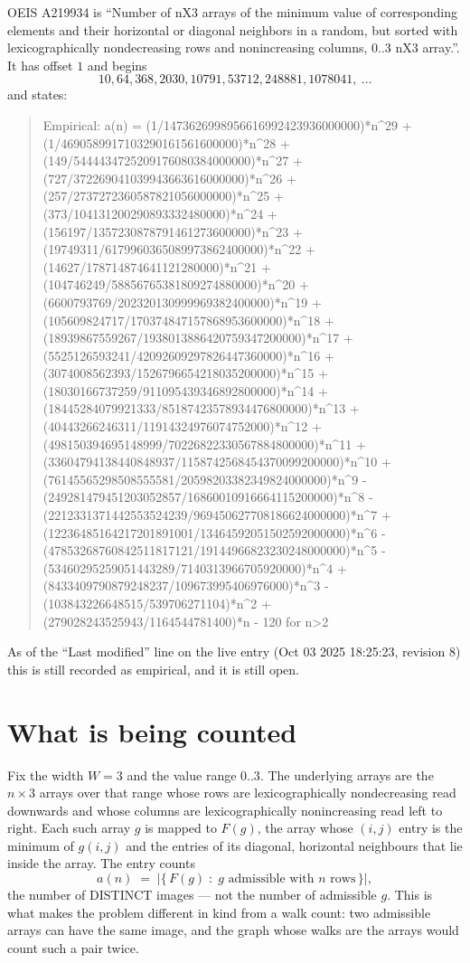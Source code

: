 \documentclass[11pt,a4paper]{article}
\theoremstyle{plain}
\theoremstyle{definition}
\begin{document}
OEIS A219934 is ``Number of nX3 arrays of the minimum value of corresponding elements and their horizontal or diagonal neighbors in a random, but sorted with lexicographically nondecreasing rows and nonincreasing columns, 0..3 nX3 array.''. It has offset $1$ and begins
\[
10, 64, 368, 2030, 10791, 53712, 248881, 1078041,\ \dots
\]
and states:
\begin{quote}
Empirical: a(n) = (1/1473626998956616992423936000000)*n\^{}29 + (1/4690589917103290161561600000)*n\^{}28 + (149/5444434725209176080384000000)*n\^{}27 + (727/372269041039943663616000000)*n\^{}26 + (257/2737272360587821056000000)*n\^{}25 + (373/104131200290893332480000)*n\^{}24 + (156197/1357230878791461273600000)*n\^{}23 + (19749311/6179960365089973862400000)*n\^{}22 + (14627/178714874641121280000)*n\^{}21 + (104746249/58856765381809274880000)*n\^{}20 + (6600793769/202320130999969382400000)*n\^{}19 + (105609824717/170374847157868953600000)*n\^{}18 + (18939867559267/1938013886420759347200000)*n\^{}17 + (5525126593241/42092609297826447360000)*n\^{}16 + (3074008562393/1526796654218035200000)*n\^{}15 + (18030166737259/911095439346892800000)*n\^{}14 + (18445284079921333/85187423578934476800000)*n\^{}13 + (40443266246311/11914324976074752000)*n\^{}12 + (498150394695148999/70226822330567884800000)*n\^{}11 + (33604794138440848937/1158742568454370099200000)*n\^{}10 + (76145565298508555581/20598203382349824000000)*n\^{}9 - (249281479451203052857/16860010916664115200000)*n\^{}8 - (2212331371442553524239/969450627708186624000000)*n\^{}7 + (12236485164217201891001/13464592051502592000000)*n\^{}6 - (47853268760842511817121/19144966823230248000000)*n\^{}5 - (53460295259051443289/7140313966705920000)*n\^{}4 + (8433409790879248237/109673995406976000)*n\^{}3 - (103843226648515/539706271104)*n\^{}2 + (279028243525943/1164544781400)*n - 120 for n>2
\end{quote}
As of the ``Last modified'' line on the live entry (Oct 03 2025 18:25:23, revision 8)
this is still recorded as empirical, and it is still open.

\section{What is being counted}

Fix the width $W=3$ and the value range $0..3$. The underlying arrays are the
$n\times3$ arrays over that range whose rows are lexicographically nondecreasing read downwards
and whose columns are lexicographically nonincreasing read left to right. Each such array $g$
is mapped to $F(g)$, the array whose $(i,j)$ entry is the minimum of $g(i,j)$ and the entries
of its diagonal, horizontal neighbours that lie inside the array. The entry counts
\[
a(n)\;=\;\bigl|\{\,F(g)\;:\;g\text{ admissible with }n\text{ rows}\,\}\bigr|,
\]
the number of DISTINCT images --- not the number of admissible $g$. This is what makes the
problem different in kind from a walk count: two admissible arrays can have the same image, and
the graph whose walks are the arrays would count such a pair twice.
\end{document}
